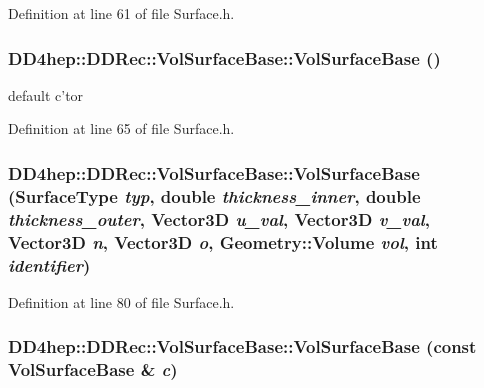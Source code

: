 Definition at line 61 of file Surface.h.\hypertarget{class_d_d4hep_1_1_d_d_rec_1_1_vol_surface_base_a837e93db1de913c7a7fccee261a59dd7}{
\subsubsection[{VolSurfaceBase}]{\setlength{\rightskip}{0pt plus 5cm}DD4hep::DDRec::VolSurfaceBase::VolSurfaceBase ()}}
\label{class_d_d4hep_1_1_d_d_rec_1_1_vol_surface_base_a837e93db1de913c7a7fccee261a59dd7}


default c'tor 

Definition at line 65 of file Surface.h.\hypertarget{class_d_d4hep_1_1_d_d_rec_1_1_vol_surface_base_a2237eee6e8b307480cfd1d1ff91b534a}{
\subsubsection[{VolSurfaceBase}]{\setlength{\rightskip}{0pt plus 5cm}DD4hep::DDRec::VolSurfaceBase::VolSurfaceBase ({\bf SurfaceType} {\em typ}, \/  double {\em thickness\_\-inner}, \/  double {\em thickness\_\-outer}, \/  {\bf Vector3D} {\em u\_\-val}, \/  {\bf Vector3D} {\em v\_\-val}, \/  {\bf Vector3D} {\em n}, \/  {\bf Vector3D} {\em o}, \/  {\bf Geometry::Volume} {\em vol}, \/  int {\em identifier})}}
\label{class_d_d4hep_1_1_d_d_rec_1_1_vol_surface_base_a2237eee6e8b307480cfd1d1ff91b534a}


Definition at line 80 of file Surface.h.\hypertarget{class_d_d4hep_1_1_d_d_rec_1_1_vol_surface_base_ab23e50535b626ef54a322d4e85744c71}{
\subsubsection[{VolSurfaceBase}]{\setlength{\rightskip}{0pt plus 5cm}DD4hep::DDRec::VolSurfaceBase::VolSurfaceBase (const {\bf VolSurfaceBase} \& {\em c})}}
\label{class_d_d4hep_1_1_d_d_rec_1_1_vol_surface_base_ab23e50535b626ef54a322d4e85744c71}


